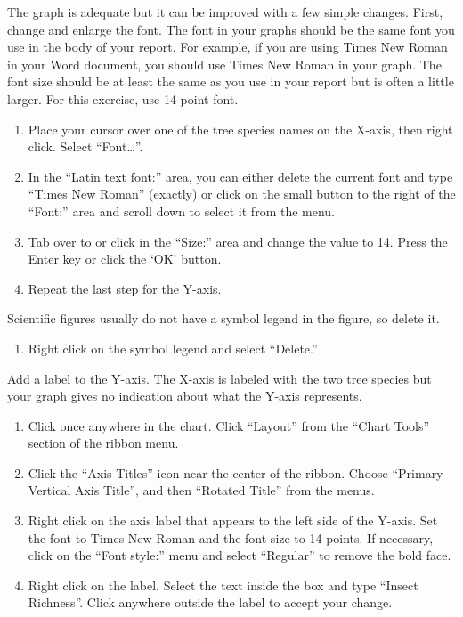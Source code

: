 \documentclass[12pt, hidelinks]{exam}
\begin{document}
The graph is adequate but it can be improved with a few simple changes. First, change and enlarge the font. The font in your graphs should be the same font you use in the body of your report. For example, if you are using Times New Roman in your Word document, you should use Times New Roman in your graph. The font size should be at least the same as you use in your report but is often a little larger. For this exercise, use 14 point font.

\begin{enumerate}[resume]
	\item Place your cursor over one of the tree species names on the X-axis, then right click. Select “Font\dots”.

	\item In the “Latin text font:” area, you can either delete the current font and type “Times New Roman” (exactly) or click on the small button to the right of the “Font:” area and scroll down to select it from the menu. 

	\item Tab over to or click in the “Size:” area and change the value to 14. Press the Enter key or click the ‘OK’ button.

	\item Repeat the last step for the Y-axis.
\end{enumerate}

Scientific figures usually do not have a symbol legend in the figure, so delete it.  

\begin{enumerate}[resume]
	\item Right click on the symbol legend and select “Delete.”
\end{enumerate}

Add a label to the Y-axis. The X-axis is labeled with the two tree species but your graph gives no indication about what the Y-axis represents.

\begin{enumerate}[resume]
	\item Click once anywhere in the chart. Click “Layout” from the “Chart Tools” section of the ribbon menu. 

	\item Click the “Axis Titles” icon near the center of the ribbon. Choose “Primary Vertical Axis Title”, and then “Rotated Title” from the menus.

	\item Right click on the axis label that appears to the left side of the Y-axis. Set the font to Times New Roman and the font size to 14 points. If necessary, click on the “Font style:” menu and select “Regular” to remove the bold face.

	\item Right click on the label. Select the text inside the box and type “Insect Richness”. Click anywhere outside the label to accept your change.
\end{enumerate}
\end{document}

